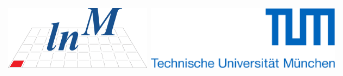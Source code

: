 \documentclass[12pt,a4paper]{article}
\begin{document}


\begin{titlepage}
\thispagestyle{empty}
\vspace{-1.5cm}
\includegraphics[height=1.5772cm]{fig/lnm}
\hfill
\includegraphics[height=1.5772cm]{fig/tum_text}

\vfill


\end{titlepage}
\end{document}
